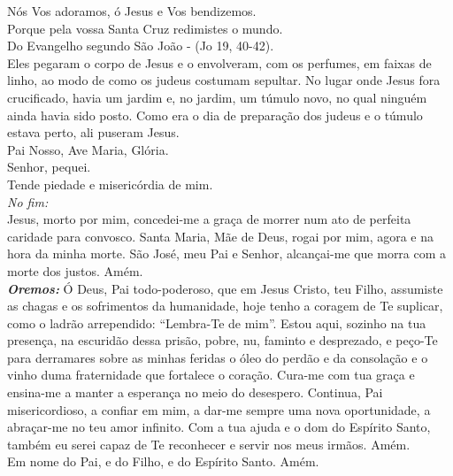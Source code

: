 \documentclass{book}
\begin{document}
\begin{flushleft}
    \VbarRed{} Nós Vos adoramos, ó Jesus e Vos bendizemos. \\
    \RbarRed{} Porque pela vossa Santa Cruz redimistes o mundo.
    \vspace{.2cm} \\
    Do Evangelho segundo São João - (\textcolor{VioletRed2}{Jo 19, 40-42}).
    \vspace{.2cm} \\
    Eles pegaram o corpo de Jesus e o envolveram, com os perfumes, em faixas de linho, ao modo de como os judeus costumam sepultar. No lugar onde Jesus fora crucificado, havia um jardim e, no jardim, um túmulo novo, no qual ninguém ainda havia sido posto. Como era o dia de preparação dos judeus e o túmulo estava perto, ali puseram Jesus.
    \vspace{.2cm} \\
    Pai Nosso, Ave Maria, Glória.
    \vspace{.2cm} \\
    \VbarRed{} Senhor, pequei. \\
    \RbarRed{} Tende piedade e misericórdia de mim.
    \vspace{.2cm} \\
    \textit{No fim:}
    \vspace{.2cm} \\
    Jesus, morto por mim, concedei-me a graça de morrer num ato de perfeita caridade para convosco. Santa Maria, Mãe de Deus, rogai por mim, agora e na hora da minha morte. São José, meu Pai e Senhor, alcançai-me que morra com a morte dos justos. Amém.
    \vspace{.2cm} \\
    \textbf{\textit{Oremos:}} Ó Deus, Pai todo-poderoso, que em Jesus Cristo, teu Filho, assumiste as chagas e os sofrimentos da humanidade, hoje tenho a coragem de Te suplicar, como o ladrão arrependido: ``Lembra-Te de mim''. Estou aqui, sozinho na tua presença, na escuridão dessa prisão, pobre, nu, faminto e desprezado, e peço-Te para derramares sobre as minhas feridas o óleo do perdão e da consolação e o vinho duma fraternidade que fortalece o coração. Cura-me com tua graça e ensina-me a manter a esperança no meio do desespero. Continua, Pai misericordioso, a confiar em mim, a dar-me sempre uma nova oportunidade, a abraçar-me no teu amor infinito. Com a tua ajuda e o dom do Espírito Santo, também eu serei capaz de Te reconhecer e servir nos meus irmãos. Amém.
    \vspace{.2cm} \\
    Em nome do Pai, \grecrossRed{} e do Filho, e do Espírito Santo. Amém.
\end{flushleft}
\end{document}
